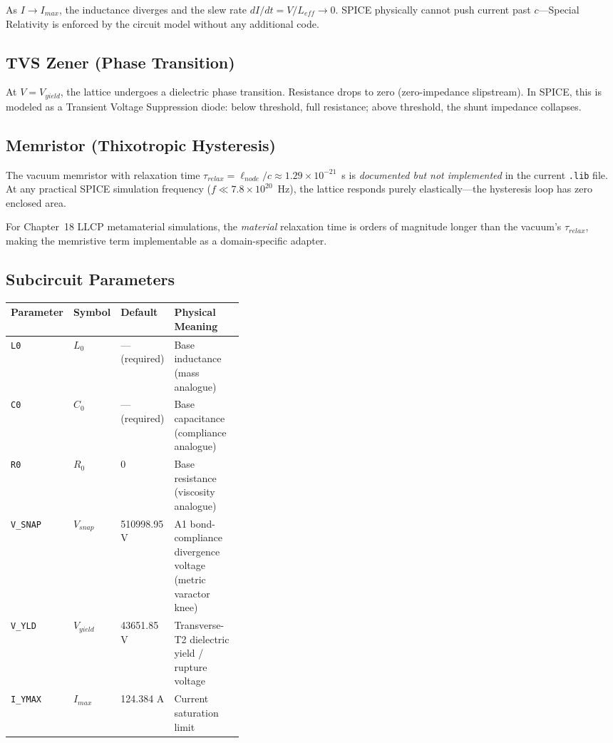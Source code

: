 \noindent As $I \to I_{max}$, the inductance diverges and the slew rate
$dI/dt = V/L_{eff} \to 0$.  SPICE physically cannot push current past
$c$---Special Relativity is enforced by the circuit model without any
additional code.


\subsection{TVS Zener (Phase Transition)}

At $V = V_{yield}$, the lattice undergoes a dielectric phase transition.
Resistance drops to zero (zero-impedance slipstream).  In SPICE, this
is modeled as a Transient Voltage Suppression diode: below threshold,
full resistance; above threshold, the shunt impedance collapses.


\subsection{Memristor (Thixotropic Hysteresis)}

The vacuum memristor with relaxation time $\tau_{relax} = \ell_{node}/c
\approx 1.29 \times 10^{-21}$~s is \textit{documented but not implemented}
in the current \texttt{.lib} file.  At any practical SPICE simulation
frequency ($f \ll 7.8 \times 10^{20}$~Hz), the lattice responds purely
elastically---the hysteresis loop has zero enclosed area.

For Chapter~18 LLCP metamaterial simulations, the \emph{material}
relaxation time is orders of magnitude longer than the vacuum's
$\tau_{relax}$, making the memristive term implementable as a
domain-specific adapter.


\subsection{Subcircuit Parameters}

\begin{center}
\renewcommand{\arraystretch}{1.3}
\begin{tabular}{l l l p{0.38\linewidth}}
\toprule
\textbf{Parameter} & \textbf{Symbol} & \textbf{Default} & \textbf{Physical Meaning} \\
\midrule
\texttt{L0}      & $L_0$      & --- (required)      & Base inductance (mass analogue) \\
\texttt{C0}      & $C_0$      & --- (required)      & Base capacitance (compliance analogue) \\
\texttt{R0}      & $R_0$      & 0                   & Base resistance (viscosity analogue) \\
\texttt{V\_SNAP} & $V_{snap}$ & 510998.95 V         & A1 bond-compliance divergence voltage (metric varactor knee) \\
\texttt{V\_YLD}  & $V_{yield}$ & 43651.85 V         & Transverse-T2 dielectric yield / rupture voltage \\
\texttt{I\_YMAX} & $I_{max}$  & 124.384 A           & Current saturation limit \\
\bottomrule
\end{tabular}
\end{center}

